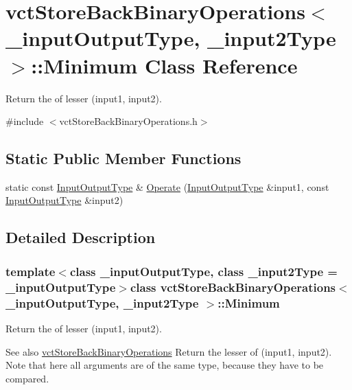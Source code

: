 \hypertarget{classvct_store_back_binary_operations_1_1_minimum}{}\section{vct\+Store\+Back\+Binary\+Operations$<$ \+\_\+input\+Output\+Type, \+\_\+input2\+Type $>$\+:\+:Minimum Class Reference}
\label{classvct_store_back_binary_operations_1_1_minimum}


Return the of lesser (input1, input2).  




{\ttfamily \#include $<$vct\+Store\+Back\+Binary\+Operations.\+h$>$}

\subsection*{Static Public Member Functions}
\begin{DoxyCompactItemize}
\item 
static const \hyperlink{classvct_store_back_binary_operations_a9dc481d9e1345541dd5d833d5e5688f3}{Input\+Output\+Type} \& \hyperlink{classvct_store_back_binary_operations_1_1_minimum_a1638948796e62c57bf475e380a90b1b6}{Operate} (\hyperlink{classvct_store_back_binary_operations_a9dc481d9e1345541dd5d833d5e5688f3}{Input\+Output\+Type} \&input1, const \hyperlink{classvct_store_back_binary_operations_a9dc481d9e1345541dd5d833d5e5688f3}{Input\+Output\+Type} \&input2)
\end{DoxyCompactItemize}


\subsection{Detailed Description}
\subsubsection*{template$<$class \+\_\+input\+Output\+Type, class \+\_\+input2\+Type = \+\_\+input\+Output\+Type$>$class vct\+Store\+Back\+Binary\+Operations$<$ \+\_\+input\+Output\+Type, \+\_\+input2\+Type $>$\+::\+Minimum}

Return the of lesser (input1, input2). 

\begin{DoxySeeAlso}{See also}
\hyperlink{classvct_store_back_binary_operations}{vct\+Store\+Back\+Binary\+Operations} Return the lesser of (input1, input2). Note that here all arguments are of the same type, because they have to be compared. 
\end{DoxySeeAlso}


